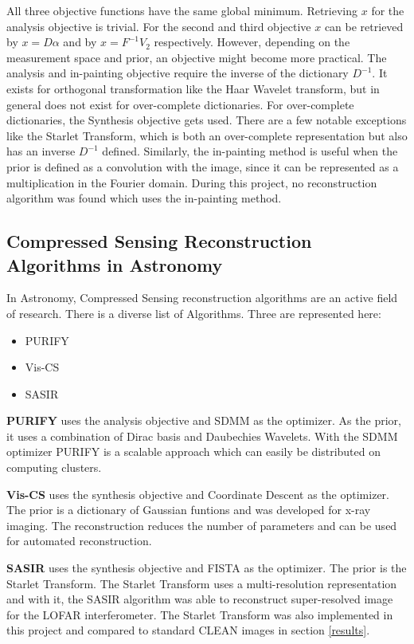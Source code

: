 All three objective functions have the same global minimum. Retrieving $x$ for the analysis objective is trivial. For the second and third objective $x$ can be retrieved by $x = D\alpha$ and by $x = F^{-1}V_2$ respectively. However, depending on the measurement space and prior, an objective might become more practical. The analysis and in-painting objective require the inverse of the dictionary $D^{-1}$. It exists for orthogonal transformation like the Haar Wavelet transform, but in general does not exist for over-complete dictionaries. For over-complete dictionaries, the Synthesis objective gets used. There are a few notable exceptions like the Starlet Transform, which is both an over-complete representation but also has an inverse $D^{-1}$ defined. Similarly, the in-painting method is useful when the prior is defined as a convolution with the image, since it can be represented as a multiplication in the Fourier domain. During this project, no reconstruction algorithm was found which uses the in-painting method.


\subsection{Compressed Sensing Reconstruction Algorithms in Astronomy}
In Astronomy, Compressed Sensing reconstruction algorithms are an active field of research. There is a diverse list of Algorithms. Three are represented here:
\begin{itemize}
	\item PURIFY \cite{carrillo2014purify}
	\item Vis-CS \cite{felix2017compressed}
	\item SASIR \cite{girard2015sparse}
\end{itemize}

\textbf{PURIFY} uses the analysis objective and SDMM as the optimizer. As the prior, it uses a combination of Dirac basis and Daubechies Wavelets. With the SDMM optimizer PURIFY is a scalable approach which can easily be distributed on computing clusters.

\textbf{Vis-CS} uses the synthesis objective and Coordinate Descent as the optimizer. The prior is a dictionary of Gaussian funtions and was developed for x-ray imaging. The reconstruction reduces the number of parameters and can be used for automated reconstruction. 

\textbf{SASIR} uses the synthesis objective and FISTA as the optimizer. The prior is the Starlet Transform. The Starlet Transform uses a multi-resolution representation and with it, the SASIR algorithm was able to reconstruct super-resolved image for the LOFAR interferometer. The Starlet Transform was also implemented in this project and compared to standard CLEAN images in section \ref{results}.


